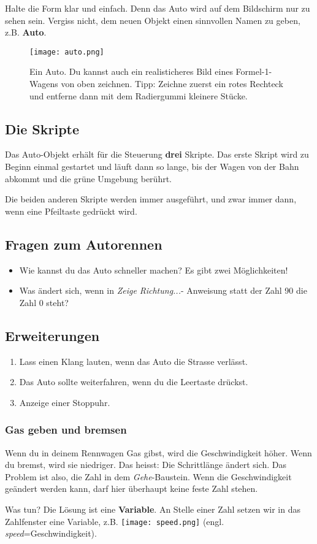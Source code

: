 \documentclass[12pt,a4paper,titlepage]{article}
\begin{document}
Halte die Form klar und einfach. Denn das Auto wird auf dem Bildschirm nur zu sehen sein. Vergiss nicht, dem neuen Objekt einen sinnvollen Namen zu geben, z.B. \textbf{Auto}.

\begin{figure}[H]
\centering
\texttt{[image: auto.png]}
\caption{Ein Auto. Du kannst auch ein realisticheres Bild eines Formel-1-Wagens von oben zeichnen. Tipp: Zeichne zuerst ein rotes Rechteck und entferne dann mit dem Radiergummi kleinere Stücke.}
\label{fig:auto}
\end{figure}

\subsection{Die Skripte}
\label{sub:skripte}

Das Auto-Objekt erhält für die Steuerung \textbf{drei} Skripte. Das erste Skript wird zu Beginn einmal gestartet und läuft dann so lange, bis der Wagen von der Bahn abkommt und die grüne Umgebung berührt.

Die beiden anderen Skripte werden immer ausgeführt, und zwar immer dann, wenn eine Pfeiltaste gedrückt wird.

\subsection{Fragen zum Autorennen}

\begin{itemize}
\item Wie kannst du das Auto schneller machen? Es gibt zwei Möglichkeiten!
\item Was ändert sich, wenn in \textit{Zeige Richtung...}- Anweisung statt der Zahl 90 die Zahl 0 steht?
\end{itemize}

\subsection{Erweiterungen}

\begin{enumerate}
\item Lass einen Klang lauten, wenn das Auto die Strasse verlässt.
\item Das Auto sollte weiterfahren, wenn du die Leertaste drückst.
\item Anzeige einer Stoppuhr.
\end{enumerate}

\subsubsection{Gas geben und bremsen}

Wenn du in deinem Rennwagen Gas gibst, wird die Geschwindigkeit höher. Wenn du bremst, wird sie niedriger. Das heisst: Die Schrittlänge ändert sich. Das Problem ist also, die Zahl in dem \textit{Gehe}-Baustein. Wenn die Geschwindigkeit geändert werden kann, darf hier überhaupt keine feste Zahl stehen.

Was tun? Die Lösung ist eine \textbf{Variable}. An Stelle einer Zahl setzen wir in das Zahlfenster eine Variable, z.B. \texttt{[image: speed.png]} (engl. \textit{speed}=Geschwindigkeit).
\end{document}
